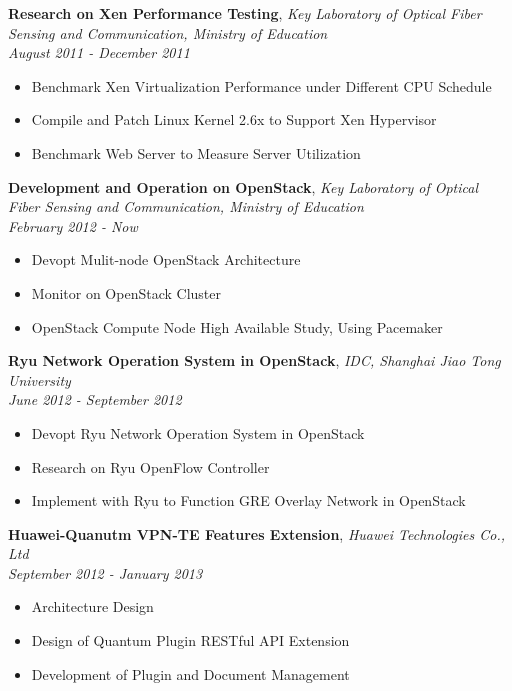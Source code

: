 \documentclass[9pt]{article}
\newenvironment{changemargin}[2]{%
  \begin{list}{}{%
    \setlength{\topsep}{0pt}%
    \setlength{\leftmargin}{#1}%
    \setlength{\rightmargin}{#2}%
    \setlength{\listparindent}{\parindent}%
    \setlength{\itemindent}{\parindent}%
    \setlength{\parsep}{\parskip}%
  }%
  \item[]}{\end{list}
}
\newenvironment{body} {
	\vspace*{-16pt}
	\begin{changemargin}{-0.25in}{-0.5in}
  }	
	{\end{changemargin}
}
\begin{document}
\begin{body}
	\vspace{14pt}
	\textbf{Research on Xen Performance Testing}, \emph{Key Laboratory of Optical Fiber Sensing and Communication, Ministry of Education } \\
  \hfill \emph{August 2011 - December 2011}\\
	\vspace*{-4pt}
	\begin{itemize} \itemsep -0pt  %
		\item Benchmark Xen Virtualization Performance under Different CPU Schedule
        \item Compile and Patch Linux Kernel 2.6x to Support Xen Hypervisor
        \item Benchmark Web Server to Measure Server Utilization
	\end{itemize}

	\textbf {Development and Operation on OpenStack}, \emph{Key Laboratory of Optical Fiber Sensing and Communication, Ministry of Education }\\
 \hfill \emph{February 2012 - Now}\\
	\vspace*{-4pt}
	\begin{itemize} \itemsep -0pt
		\item Devopt Mulit-node OpenStack Architecture
		\item Monitor on OpenStack Cluster
        \item OpenStack Compute Node High Available Study, Using Pacemaker
	\end{itemize}

    \textbf {Ryu Network Operation System in OpenStack}, \emph{IDC, Shanghai Jiao Tong University} \\ \hfill \emph{June 2012 - September 2012}\\
	\vspace*{-4pt}
	\begin{itemize} \itemsep -0pt
		\item Devopt Ryu Network Operation System in OpenStack
		\item Research on Ryu OpenFlow Controller
        \item Implement with Ryu to Function GRE Overlay Network in OpenStack
	\end{itemize}
 \textbf {Huawei-Quanutm VPN-TE Features  Extension}, \emph{ Huawei Technologies Co., Ltd} \\ \hfill \emph{September 2012 - January 2013}\\
	\vspace*{-4pt}
	\begin{itemize} \itemsep -0pt
		\item Architecture Design
		\item Design of Quantum Plugin RESTful API Extension
        \item Development of Plugin and Document Management
	\end{itemize}
\end{body}
\end{document}
